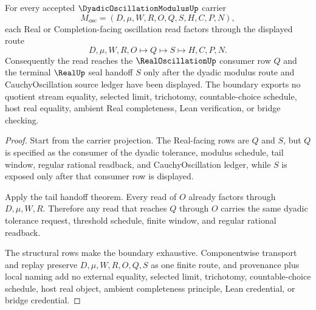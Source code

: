 \begin{theorem}
\label{thm:dyadic-oscillation-modulus-real-boundary}
For every accepted $\DyadicOscillationModulusUp$ carrier
$$
M_{\mathrm{osc}}=(D,\mu,W,R,O,Q,S,H,C,P,N),
$$
each Real or Completion-facing oscillation read factors through the displayed route
$$
D,\mu,W,R,O \longmapsto Q \longmapsto S \longmapsto H,C,P,N .
$$
Consequently the read reaches the $\RealOscillationUp$ consumer row $Q$ and the terminal $\RealUp$ seal handoff $S$ only after the dyadic modulus route and CauchyOscillation source ledger have been displayed. The boundary exports no quotient stream equality, selected limit, trichotomy, countable-choice schedule, host real equality, ambient Real completeness, Lean verification, or bridge checking.
\end{theorem}
\begin{proof}
Start from the carrier projection. The Real-facing rows are $Q$ and $S$, but $Q$ is specified as the consumer of the dyadic tolerance, modulus schedule, tail window, regular rational readback, and CauchyOscillation ledger, while $S$ is exposed only after that consumer row is displayed.

Apply the tail handoff theorem. Every read of $O$ already factors through $D,\mu,W,R$. Therefore any read that reaches $Q$ through $O$ carries the same dyadic tolerance request, threshold schedule, finite window, and regular rational readback.

The structural rows make the boundary exhaustive. Componentwise transport and replay preserve $D,\mu,W,R,O,Q,S$ as one finite route, and provenance plus local naming add no external equality, selected limit, trichotomy, countable-choice schedule, host real object, ambient completeness principle, Lean credential, or bridge credential.
\end{proof}


